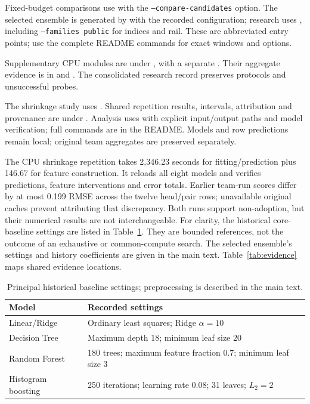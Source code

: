 \documentclass[conference]{IEEEtran}
\newcommand{\code}[1]{\texttt{\small #1}}
\begin{document}
Fixed-budget comparisons use  with the \code{--compare-candidates} option. The selected ensemble is generated by  with the recorded configuration; research uses , including \code{--families public} for indices and rail. These are abbreviated entry points; use the complete README commands for exact windows and options.\par
{\raggedright Supplementary CPU modules are under , with a separate . Their aggregate evidence is in  and . The consolidated research record preserves protocols and unsuccessful probes.\par}
{\raggedright The shrinkage study uses . Shared repetition results, intervals, attribution and provenance are under . Analysis uses  with explicit input/output paths and model verification; full commands are in the README. Models and row predictions remain local; original team aggregates are preserved separately.\par}
The CPU shrinkage repetition takes 2,346.23 seconds for fitting/prediction plus 146.67 for feature construction. It reloads all eight models and verifies predictions, feature interventions and error totals. Earlier team-run scores differ by at most 0.199 RMSE across the twelve head/pair rows; unavailable original caches prevent attributing that discrepancy. Both runs support non-adoption, but their numerical results are not interchangeable.
For clarity, the historical core-baseline settings are listed in Table~\ref{tab:parameters}. They are bounded references, not the outcome of an exhaustive or common-compute search. The selected ensemble's settings and history coefficients are given in the main text. Table~\ref{tab:evidence} maps shared evidence locations.
\begin{table}[!ht]
\caption{Principal historical baseline settings; preprocessing is described in the main text.}
\label{tab:parameters}\centering\footnotesize
\begin{tabular}{@{}lp{}@{}}
\toprule Model & Recorded settings \\\midrule
Linear/Ridge & Ordinary least squares; Ridge $\alpha=10$ \\
Decision Tree & Maximum depth 18; minimum leaf size 20 \\
Random Forest & 180 trees; maximum feature fraction 0.7; minimum leaf size 3 \\
Histogram boosting & 250 iterations; learning rate 0.08; 31 leaves; $L_2=2$ \\\bottomrule
\end{tabular}
\end{table}
\end{document}
